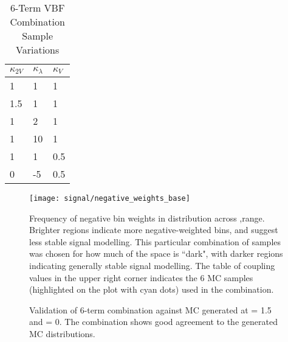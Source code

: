     \begin{table}[] \centering
    \caption{6-Term VBF Combination Sample Variations}
    \label{tab:vbf_hh_6term_varlist}
    \begin{tabular}{ |l|l|l| }
        \hline
        \textbf {$\kappa_{2V}$} & \textbf {$\kappa_\lambda$} & \textbf {$\kappa_V$} \\
        \hline
            1   &   1 & 1   \\
            1.5 &   1 & 1   \\
            1   &   2 & 1   \\
            1   &  10 & 1   \\
            1   &   1 & 0.5 \\
            0   &  -5 & 0.5 \\
        \hline
    \end{tabular} \end{table}

    \begin{figure}
        \texttt{[image: signal/negative\_weights\_base]}
        \caption{
            Frequency of negative bin weights in \mhh distribution across \kvv,\kl range.
            Brighter regions indicate more negative-weighted bins, and suggest less stable signal modelling.
            This particular combination of samples was chosen for how much of the space is ``dark",
                with darker regions indicating generally stable signal modelling.
            The table of coupling values in the upper right corner indicates the 6 MC samples
                (highlighted on the plot with cyan dots) used in the combination.
        }
        \label{fig:vbf_hh_6term_nWeight_grid}
    \end{figure}


    \begin{figure}
        \caption{
            Validation of 6-term combination against MC generated at \kv = 1.5 and \kl = 0.
            The combination shows good agreement to the generated MC distributions.
        }
        \label{fig:vbf_hh_6term_validation}
    \end{figure}



